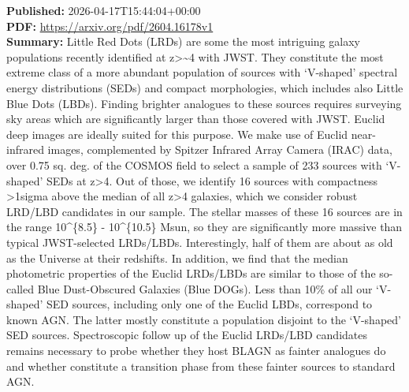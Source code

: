 \documentclass[11pt]{article}
\begin{document}
\textbf{Published:} 2026-04-17T15:44:04+00:00\\
\textbf{PDF:} \href{https://arxiv.org/pdf/2604.16178v1}{https://arxiv.org/pdf/2604.16178v1}\\
\textbf{Summary:}
Little Red Dots (LRDs) are some the most intriguing galaxy populations recently identified at z>\textasciitilde{}4 with JWST. They constitute the most extreme class of a more abundant population of sources with `V-shaped' spectral energy distributions (SEDs) and compact morphologies, which includes also Little Blue Dots (LBDs). Finding brighter analogues to these sources requires surveying sky areas which are significantly larger than those covered with JWST. Euclid deep images are ideally suited for this purpose. We make use of Euclid near-infrared images, complemented by Spitzer Infrared Array Camera (IRAC) data, over 0.75 sq. deg. of the COSMOS field to select a sample of 233 sources with `V-shaped' SEDs at z>4. Out of those, we identify 16 sources with compactness >1sigma above the median of all z>4 galaxies, which we consider robust LRD/LBD candidates in our sample. The stellar masses of these 16 sources are in the range 10\textasciicircum{}\{8.5\} - 10\textasciicircum{}\{10.5\} Msun, so they are significantly more massive than typical JWST-selected LRDs/LBDs. Interestingly, half of them are about as old as the Universe at their redshifts. In addition, we find that the median photometric properties of the Euclid LRDs/LBDs are similar to those of the so-called Blue Dust-Obscured Galaxies (Blue DOGs). Less than 10\% of all our `V-shaped' SED sources, including only one of the Euclid LBDs, correspond to known AGN. The latter mostly constitute a population disjoint to the `V-shaped' SED sources. Spectroscopic follow up of the Euclid LRDs/LBD candidates remains necessary to probe whether they host BLAGN as fainter analogues do and whether constitute a transition phase from these fainter sources to standard AGN.
\newpage
\end{document}
